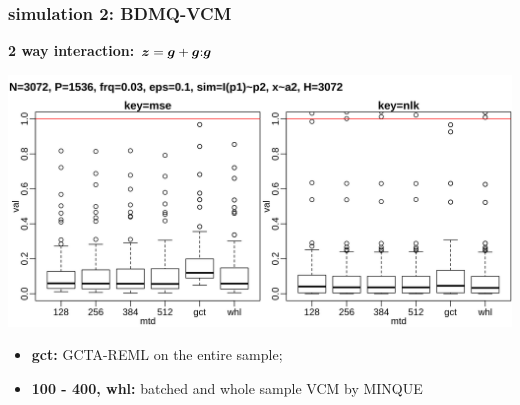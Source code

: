 \documentclass{beamer}
\begin{document}
\begin{frame}\frametitle{simulation 2: BDMQ-VCM}
  \textbf{2 way interaction: ${\bm{z}} = {\bm{g}} + {\bm{g}}\mathbf{:}{\bm{g}}$} \\
  \centerline{\includegraphics[width=.9\linewidth]{img/ukb_bat_p02}}
  \textbf{\color{blue}{inner plot: strategies, from left to right:}}
  \begin{itemize}
  \item \textbf{gct:} GCTA-REML on the entire sample;
  \item \textbf{100 - 400, whl:} batched and whole sample VCM by MINQUE
  \end{itemize}
\end{frame}
\end{document}
